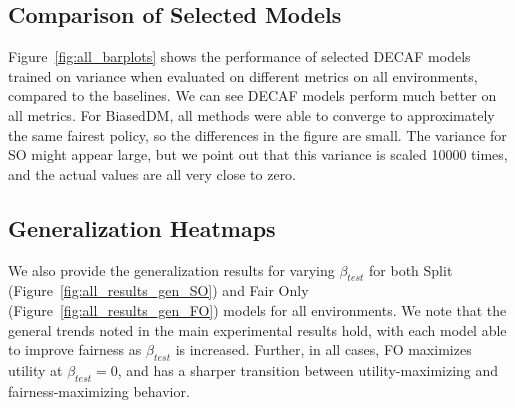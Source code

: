 \subsection{Comparison of Selected Models}
Figure~\ref{fig:all_barplots} shows the performance of selected DECAF models trained on variance when evaluated on different metrics on all environments, compared to the baselines. We can see DECAF models perform much better on all metrics. For BiasedDM, all methods were able to converge to approximately the same fairest policy, so the differences in the figure are small. The variance for SO might appear large, but we point out that this variance is scaled 10000 times, and the actual values are all very close to zero.

\subsection{Generalization Heatmaps}
We also provide the generalization results for varying $\beta_{test}$ for both Split (Figure~\ref{fig:all_results_gen_SO}) and Fair Only (Figure~\ref{fig:all_results_gen_FO}) models for all environments. We note that the general trends noted in the main experimental results hold, with each model able to improve fairness as $\beta_{test}$ is increased. Further, in all cases, FO maximizes utility at $\beta_{test}=0$, and has a sharper transition between utility-maximizing and fairness-maximizing behavior.
